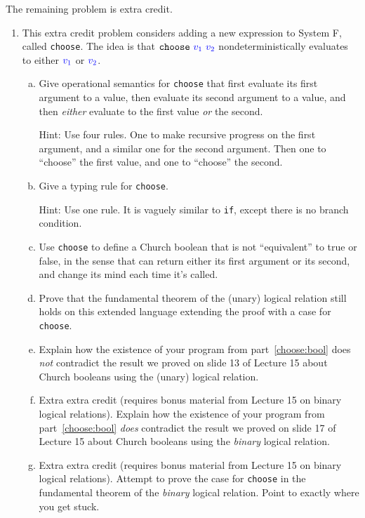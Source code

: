 \documentclass{article}
\theoremstyle{definition}
\newcommand{\meta}[1]{{\color{blue}#1}}
\begin{document}
\noindent{}The remaining problem is extra credit.

\begin{enumerate}[resume*]
\item This extra credit problem considers adding a new expression to System F, called \texttt{choose}.
  The idea is that $\mathtt{choose}\ \meta{v_1}\ \meta{v_2}$ nondeterministically evaluates to
  either $\meta{v_1}$ or $\meta{v_2}$.
  \begin{enumerate}[(a),left=1em]
  \item Give operational semantics for \texttt{choose} that first evaluate its
    first argument to a value, then evaluate its second argument to a value, and
    then \emph{either} evaluate to the first value \emph{or} the second.

    Hint: Use four rules. One to make recursive progress on the first argument,
    and a similar one for the second argument. Then one to ``choose'' the first
    value, and one to ``choose'' the second.
  \item Give a typing rule for \texttt{choose}.

    Hint: Use one rule. It is vaguely similar to \texttt{if}, except there is no
    branch condition.
  \item\label{choose:bool} Use \texttt{choose} to define a Church boolean that is not ``equivalent'' to true or false,
    in the sense that can return either its first argument or its second, and change its mind each time it's called.
  \item Prove that the fundamental theorem of the (unary) logical relation still holds
    on this extended language extending the proof with a case for \texttt{choose}.
  \item Explain how the existence of your program from part~\ref{choose:bool}
    does \emph{not} contradict the result we proved on slide 13 of Lecture 15 about
    Church booleans using the (unary) logical relation.
  \item Extra extra credit (requires bonus material from Lecture 15 on binary logical relations).
    Explain how the existence of your program from part~\ref{choose:bool}
    \emph{does} contradict the result we proved on slide 17 of Lecture 15 about
    Church booleans using the \emph{binary} logical relation.
  \item Extra extra credit (requires bonus material from Lecture 15 on binary logical
    relations).  Attempt to prove the case for \texttt{choose} in the
    fundamental theorem of the \emph{binary} logical relation. Point to exactly
    where you get stuck.
  \end{enumerate}
\end{enumerate}
\end{document}
